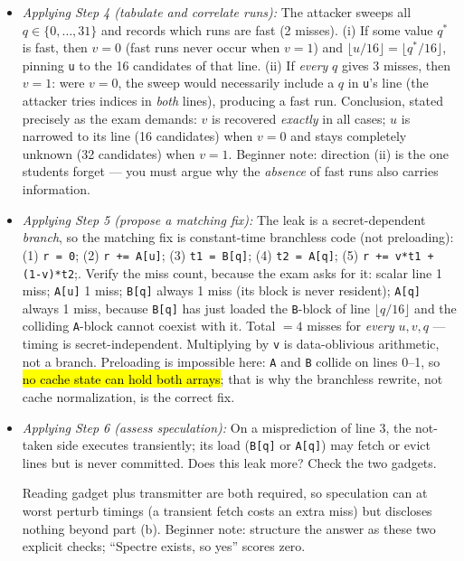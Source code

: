 \documentclass[12pt, a4paper]{article}
\newcommand{\term}[1]{\textbf{\textit{#1}}}        %
\newcommand{\imp}[1]{\hl{#1}}                       %
\begin{document}
\begin{itemize}
    \item \textit{Applying Step 4 (tabulate and correlate runs):} The attacker sweeps all $q \in \{0, \dots, 31\}$ and records which runs are fast (2 misses). (i) If some value $q^{\ast}$ is fast, then $v = 0$ (fast runs never occur when $v = 1$) and $\lfloor u/16 \rfloor = \lfloor q^{\ast}/16 \rfloor$, pinning \texttt{u} to the 16 candidates of that line. (ii) If \emph{every} $q$ gives 3 misses, then $v = 1$: were $v = 0$, the sweep would necessarily include a $q$ in \texttt{u}'s line (the attacker tries indices in \emph{both} lines), producing a fast run. Conclusion, stated precisely as the exam demands: $v$ is recovered \emph{exactly} in all cases; $u$ is narrowed to its line (16 candidates) when $v = 0$ and stays completely unknown (32 candidates) when $v = 1$. Beginner note: direction (ii) is the one students forget --- you must argue why the \emph{absence} of fast runs also carries information.
    \item \textit{Applying Step 5 (propose a matching fix):} The leak is a secret-dependent \emph{branch}, so the matching fix is constant-time branchless code (not preloading): (1) \texttt{r = 0}; (2) \texttt{r += A[u]}; (3) \texttt{t1 = B[q]}; (4) \texttt{t2 = A[q]}; (5) \texttt{r += v*t1 + (1-v)*t2};. Verify the miss count, because the exam asks for it: scalar line 1 miss; \texttt{A[u]} 1 miss; \texttt{B[q]} always 1 miss (its block is never resident); \texttt{A[q]} always 1 miss, because \texttt{B[q]} has just loaded the \texttt{B}-block of line $\lfloor q/16 \rfloor$ and the colliding \texttt{A}-block cannot coexist with it. Total $= 4$ misses for \emph{every} $u, v, q$ --- timing is secret-independent. Multiplying by \texttt{v} is data-oblivious arithmetic, not a branch. Preloading is impossible here: \texttt{A} and \texttt{B} collide on lines 0--1, so \imp{no cache state can hold both arrays}; that is why the branchless rewrite, not cache normalization, is the correct fix.
    \item \textit{Applying Step 6 (assess speculation):} On a misprediction of line 3, the not-taken side executes transiently; its load (\texttt{B[q]} or \texttt{A[q]}) may fetch or evict lines but is never committed. Does this leak more? Check the two gadgets.  Reading gadget plus transmitter are both required, so speculation can at worst perturb timings (a transient fetch costs an extra miss) but discloses nothing beyond part (b). Beginner note: structure the answer as these two explicit checks; ``Spectre exists, so yes'' scores zero.
\end{itemize}
\end{document}
